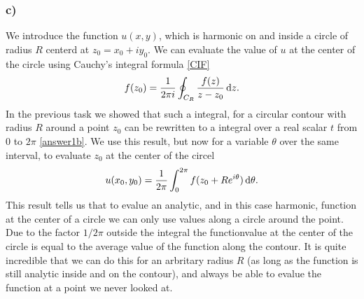 \documentclass[12pt,twoside]{article}
\begin{document}
\subsubsection*{c)}
We introduce the function $u(x, y)$, which is harmonic on and inside a circle of radius $R$ centerd at $z_0=x_0+iy_0$. We can evaluate the value of $u$ at the center of the circle using Cauchy's integral formula \eqref{CIF}
\begin{equation}
  f(z_0) = \frac{1}{2\pi i} \oint_{C_R} \frac{f(z)}{z-z_0}\dif z.
\end{equation}
In the previous task we showed that such a integral, for a circular contour with radius $R$ around a point $z_0$ can be rewritten to a integral over a real scalar $t$ from $0$ to $2\pi$ \eqref{answer1b}. We use this result, but now for a variable $\theta$ over the same interval, to evaluate $z_0$ at the center of the circel
\begin{equation}
  u(x_0, y_0) = \frac{1}{2\pi} \int_{0}^{2\pi} f(z_0+Re^{i\theta}) \dif \theta.
\end{equation}
This result tells us that to evalue an analytic, and in this case harmonic, function at the center of a circle we can only use values along a circle around the point. Due to the factor $1/2\pi$ outside the integral the functionvalue at the center of the circle is equal to the average value of the function along the contour. It is quite incredible that we can do this for an arbritary radius $R$ (as long as the function is still analytic inside and on the contour), and always be able to evalue the function at a point we never looked at.
\end{document}
